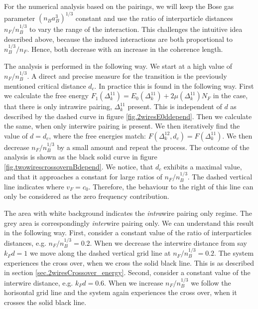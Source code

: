 For the numerical analysis based on the pairings, we will keep the Bose gas parameter $(n_Ba_B^3)^{1/3}$ constant and use the ratio of interparticle distances $n_F/n_B^{1/3}$ to vary the range of the interaction. This challenges the intuitive idea described above, because the induced interactions are both proportional to $n_B^{1/3}/n_F$. Hence, both decrease with an increase in the coherence length. 

The analysis is performed in the following way. We start at a high value of $n_F/n_B^{1/3}$. A direct and precise measure for the transition is the previously mentioned critical distance $d_c$. In practice this is found in the following way. First we calculate the free energy $F_1(\Delta^{11}_k) = E_0(\Delta^{11}_k) + 2 \mu (\Delta^{11}_k) N_F$ in the case, that there is only intrawire pairing, $\Delta^{11}_k$ present. This is independent of $d$ as described by the dashed curve in figure \ref{fig.2wiresE0ddepend}. Then we calculate the same, when only interwire pairing is present. We then iteratively find the value of $d = d_c$, where the free energies match: $F(\Delta^{12}_k, d_c) = F(\Delta^{11}_k)$. We then decrease $n_F/n_B^{1/3}$ by a small amount and repeat the process. The outcome of the analysis is shown as the black solid curve in figure \ref{fig.twowirescrossovernBdepend}. We notice, that $d_c$ exhibits a maximal value, and that it approaches a constant for large ratios of $n_F/n_B^{1/3}$. The dashed vertical line indicates where $v_F = c_0$. Therefore, the behaviour to the right of this line can only be considered as the zero frequency contribution. 

The area with white background indicates the \textit{intra}wire pairing only regime. The grey area is correspondingly \textit{inter}wire pairing only. We can understand this result in the following way. First, consider a constant value of the ratio of interparticles distances, e.g. $n_F/n_B^{1/3} = 0.2$. When we decrease the interwire distance from say $k_Fd = 1$ we move along the dashed vertical grid line at $n_F/n_B^{1/3} = 0.2$. The system experiences the cross over, when we cross the solid black line. This is as described in section \ref{sec.2wiresCrossover_energy}. Second, consider a constant value of the interwire distance, e.g. $k_Fd = 0.6$. When we increase $n_F/n_B^{1/3}$ we follow the horisontal grid line and the system again experiences the cross over, when it crosses the solid black line. 

